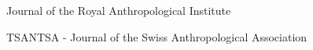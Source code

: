 


\begin{cvmemberships}
  \cvmembership
    {Journal of the Royal Anthropological Institute} %
    {} %

  \cvmembership
    {TSANTSA - Journal of the Swiss Anthropological Association} %
    {} %

\end{cvmemberships}
